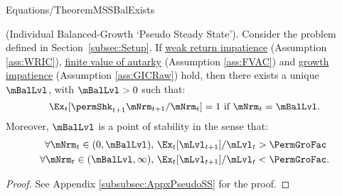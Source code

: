 \documentclass[BufferStockTheory]{subfiles}
\begin{document}
\begin{verbatimwrite}{Equations/TheoremMSSBalExists}
  \begin{theorem}(Individual Balanced-Growth `Pseudo Steady State').
    Consider the problem defined in Section~\ref{subsec:Setup}.
If \hyperlink{WRIC}{weak return impatience} (Assumption \ref{ass:WRIC}), \hyperlink{FVAC}{finite value of autarky} (Assumption \ref{ass:FVAC}) and \hyperlink{GIC}{growth impatience} (Assumption \ref{ass:GICRaw}) hold, then there exists a unique $\mBalLvl$, with $\mBalLvl>0$ such that:
    \begin{equation}
      \Ex_t [\permShk_{t+1}{\mNrm}_{t+1}/\mNrm_t] = 1 \mbox{~if~} \mNrm_t = \mBalLvl.
      \label{eq:mBalLvl}
    \end{equation}
    Moreover, $\mBalLvl$ is a point of stability in the sense that:
    \begin{equation}
      \label{eq:stabilityStE}
      \begin{split}
        \forall {\mNrm}_t\in(0,\mBalLvl),      \,\,& \Ex_{t}[\mLvl_{t+1}]/\mLvl_{t} > \PermGroFac \\
        \forall {\mNrm}_t\in(\mBalLvl,\infty), \,\,& \Ex_{t}[\mLvl_{t+1}]/\mLvl_{t} < \PermGroFac.
      \end{split}
    \end{equation}
  \end{theorem}
\end{verbatimwrite}

\begin{proof}
See Appendix \ref{subsubsec:AppxPseudoSS} for the proof. 
\end{proof}
\end{document}
